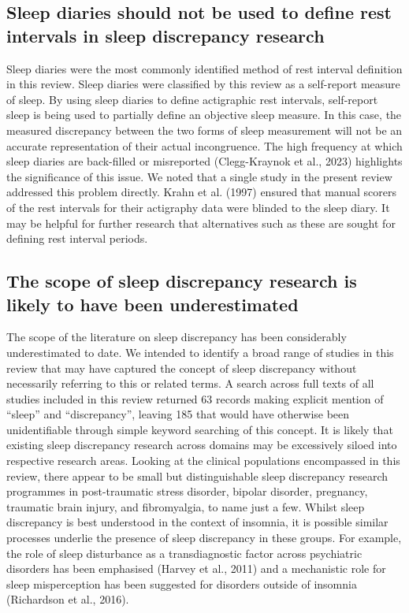 \documentclass[
]{article}
\begin{document}
\subsection{Sleep diaries should not be used to define rest intervals in sleep discrepancy research}\label{actidiary}

Sleep diaries were the most commonly identified method of rest interval definition in this review. Sleep diaries were classified by this review as a self-report measure of sleep. By using sleep diaries to define actigraphic rest intervals, self-report sleep is being used to partially define an objective sleep measure. In this case, the measured discrepancy between the two forms of sleep measurement will not be an accurate representation of their actual incongruence. The high frequency at which sleep diaries are back-filled or misreported (Clegg-Kraynok et al., 2023) highlights the significance of this issue. We noted that a single study in the present review addressed this problem directly. Krahn et al. (1997) ensured that manual scorers of the rest intervals for their actigraphy data were blinded to the sleep diary. It may be helpful for further research that alternatives such as these are sought for defining rest interval periods.

\subsection{The scope of sleep discrepancy research is likely to have been underestimated}\label{the-scope-of-sleep-discrepancy-research-is-likely-to-have-been-underestimated}

The scope of the literature on sleep discrepancy has been considerably underestimated to date. We intended to identify a broad range of studies in this review that may have captured the concept of sleep discrepancy without necessarily referring to this or related terms. A search across full texts of all studies included in this review returned 63 records making explicit mention of ``sleep'' and ``discrepancy'', leaving 185 that would have otherwise been unidentifiable through simple keyword searching of this concept. It is likely that existing sleep discrepancy research across domains may be excessively siloed into respective research areas. Looking at the clinical populations encompassed in this review, there appear to be small but distinguishable sleep discrepancy research programmes in post-traumatic stress disorder, bipolar disorder, pregnancy, traumatic brain injury, and fibromyalgia, to name just a few. Whilst sleep discrepancy is best understood in the context of insomnia, it is possible similar processes underlie the presence of sleep discrepancy in these groups. For example, the role of sleep disturbance as a transdiagnostic factor across psychiatric disorders has been emphasised (Harvey et al., 2011) and a mechanistic role for sleep misperception has been suggested for disorders outside of insomnia (Richardson et al., 2016).
\end{document}
